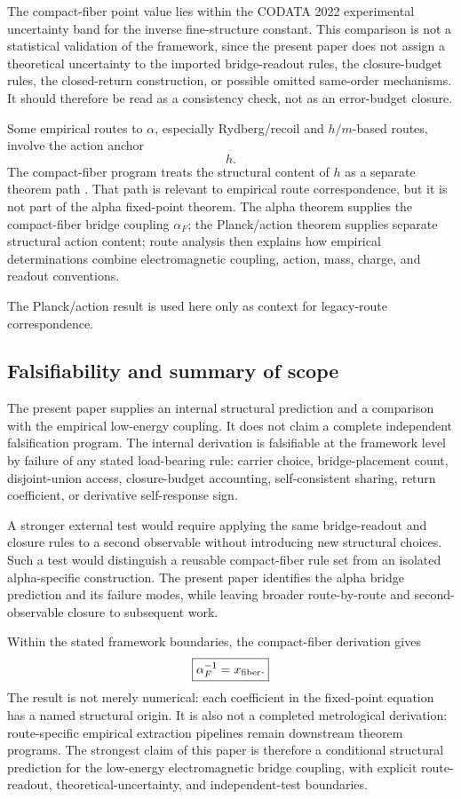 The compact-fiber point value lies within the CODATA 2022 experimental
uncertainty band for the inverse fine-structure constant. This comparison
is not a statistical validation of the framework, since the present paper
does not assign a theoretical uncertainty to the imported bridge-readout
rules, the closure-budget rules, the closed-return construction, or
possible omitted same-order mechanisms. It should therefore be read as a
consistency check, not as an error-budget closure.

Some empirical routes to \(\alpha\), especially Rydberg/recoil and
\(h/m\)-based routes, involve the action anchor
\[
h.
\]
The compact-fiber program treats the structural content of \(h\) as a
separate theorem path \cite{Wells2026PlanckGravity}. That path is
relevant to empirical route correspondence, but it is not part of the
alpha fixed-point theorem. The
alpha theorem supplies the compact-fiber bridge coupling \(\alpha_F\);
the Planck/action theorem supplies separate structural action content;
route analysis then explains how empirical determinations combine
electromagnetic coupling, action, mass, charge, and readout conventions.

The Planck/action result is used here only as context for legacy-route
correspondence.

\subsection{Falsifiability and summary of scope}

The present paper supplies an internal structural prediction and a
comparison with the empirical low-energy coupling. It does not claim a
complete independent falsification program. The internal derivation is
falsifiable at the framework level by failure of any stated load-bearing
rule: carrier choice, bridge-placement count, disjoint-union access,
closure-budget accounting, self-consistent sharing, return coefficient,
or derivative self-response sign.

A stronger external test would require applying the same bridge-readout
and closure rules to a second observable without introducing new
structural choices. Such a test would distinguish a reusable compact-fiber
rule set from an isolated alpha-specific construction. The present paper
identifies the alpha bridge prediction and its failure modes, while
leaving broader route-by-route and second-observable closure to
subsequent work.

Within the stated framework boundaries, the compact-fiber derivation gives
\[
\boxed{
\alpha_F^{-1}=x_{\rm fiber}.
}
\]
The result is not merely numerical: each coefficient in the fixed-point
equation has a named structural origin. It is also not a completed
metrological derivation: route-specific empirical extraction pipelines
remain downstream theorem programs. The strongest claim of this paper is
therefore a conditional structural prediction for the low-energy
electromagnetic bridge coupling, with explicit route-readout,
theoretical-uncertainty, and independent-test boundaries.